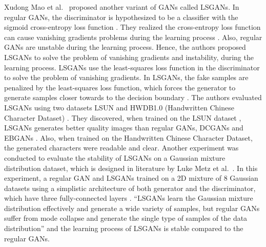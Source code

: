 Xudong Mao et al.\ \cite{mao2017squares} proposed another variant of \acp{GAN} called \acp{LSGAN}. In regular \acp{GAN}, the discriminator is hypothesized to be a classifier with the sigmoid cross-entropy loss function \cite{mao2017squares}. They realized the cross-entropy loss function can cause vanishing gradients problems during the learning process \cite{mao2017squares}. Also, regular \acp{GAN} are unstable during the learning process. Hence, the authors proposed \acp{LSGAN} to solve the problem of vanishing gradients and instability, during the learning process. \acp{LSGAN} use the least-squares loss function in the discriminator to solve the problem of vanishing gradients. In \acp{LSGAN}, the fake samples are penalized by the least-squares loss function, which forces the generator to generate samples closer towards to the decision boundary \cite{mao2017squares}. The authors evaluated \acp{LSGAN} using two datasets LSUN \cite{yu2016lsun} and HWDB1.0 (Handwritten Chinese Character Dataset) \cite{6065551}. They discovered, when trained on the LSUN dataset \cite{yu2016lsun}, \acp{LSGAN} generates better quality images than regular \acp{GAN}, \acp{DCGAN} \cite{radford2016unsupervised} and \acp{EBGAN} \cite{zhao2017energybased}. Also, when trained on the Handwritten Chinese Character Dataset, the generated characters were readable and clear. Another experiment was conducted to evaluate the stability of \acp{LSGAN} on a Gaussian mixture distribution dataset, which is designed in literature by Luke Metz et al.\ \cite{metz2017unrolled}. In this experiment, a regular \ac{GAN} and \acp{LSGAN} trained on a \ac{2D} mixture of 8 Gaussian datasets using a simplistic architecture of both generator and the discriminator, which have three fully-connected layers \cite{mao2017squares}. ``\acp{LSGAN} learn the Gaussian mixture distribution effectively and generate a wide variety of samples, but regular \acp{GAN} suffer from mode collapse and generate the single type of samples of the data distribution'' \cite{mao2017squares} and the learning process of \acp{LSGAN} is stable compared to the regular \acp{GAN}.



